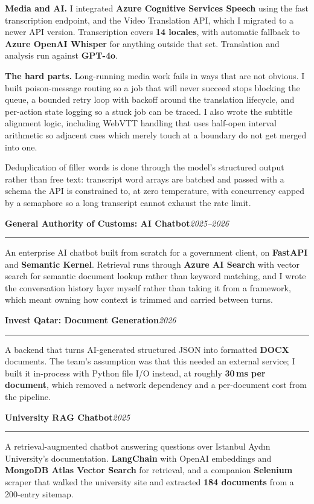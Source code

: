\documentclass[11pt,a4paper]{article}
\newcommand{\entry}[2]{%
  \vspace{6pt}%
  {\Large\bfseries #1}\hfill{\itshape\small #2}\par
  \vspace{3pt}\hrule\vspace{4pt}%
}
\begin{document}
\textbf{Media and AI.} I integrated \textbf{Azure Cognitive Services Speech}
using the fast transcription endpoint, and the Video Translation API, which I
migrated to a newer API version. Transcription covers \textbf{14 locales}, with
automatic fallback to \textbf{Azure OpenAI Whisper} for anything outside that
set. Translation and analysis run against \textbf{GPT-4o}.

\textbf{The hard parts.} Long-running media work fails in ways that are not
obvious. I built poison-message routing so a job that will never succeed stops
blocking the queue, a bounded retry loop with backoff around the translation
lifecycle, and per-action state logging so a stuck job can be traced. I also
wrote the subtitle alignment logic, including WebVTT handling that uses
half-open interval arithmetic so adjacent cues which merely touch at a boundary
do not get merged into one.

Deduplication of filler words is done through the model's structured output
rather than free text: transcript word arrays are batched and passed with a
schema the API is constrained to, at zero temperature, with concurrency capped
by a semaphore so a long transcript cannot exhaust the rate limit.

\entry{General Authority of Customs: AI Chatbot}{2025--2026}

An enterprise AI chatbot built from scratch for a government client, on
\textbf{FastAPI} and \textbf{Semantic Kernel}. Retrieval runs through
\textbf{Azure AI Search} with vector search for semantic document lookup rather
than keyword matching, and I wrote the conversation history layer myself rather
than taking it from a framework, which meant owning how context is trimmed and
carried between turns.

\entry{Invest Qatar: Document Generation}{2026}

A backend that turns AI-generated structured JSON into formatted \textbf{DOCX}
documents. The team's assumption was that this needed an external service; I
built it in-process with Python file I/O instead, at roughly \textbf{30\,ms per
document}, which removed a network dependency and a per-document cost from the
pipeline.

\entry{University RAG Chatbot}{2025}

A retrieval-augmented chatbot answering questions over Istanbul Ayd{\i}n
University's documentation. \textbf{LangChain} with OpenAI embeddings and
\textbf{MongoDB Atlas Vector Search} for retrieval, and a companion
\textbf{Selenium} scraper that walked the university site and extracted
\textbf{184 documents} from a 200-entry sitemap.
\end{document}
